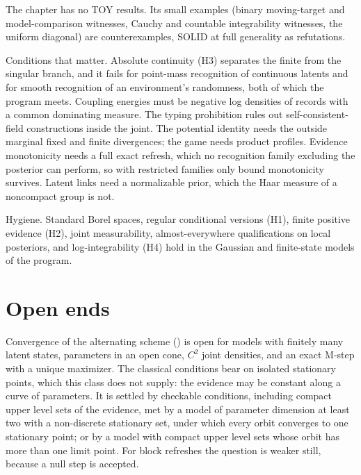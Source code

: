 The chapter has no TOY results. Its small examples (binary moving-target and model-comparison witnesses,
Cauchy and countable integrability witnesses, the uniform diagonal) are counterexamples, SOLID at full
generality as refutations.

\begin{hygiene}
Conditions that matter. Absolute continuity (H3) separates the finite from the singular branch, and it fails
for point-mass recognition of continuous latents and for smooth recognition of an environment's randomness,
both of which the program meets. Coupling energies must be negative log densities of records with a common
dominating measure. The typing prohibition rules out self-consistent-field constructions inside the joint. The
potential identity needs the outside marginal fixed and finite divergences; the game needs product profiles.
Evidence monotonicity needs a full exact refresh, which no recognition family excluding the posterior can
perform, so with restricted families only bound monotonicity survives. Latent links need a normalizable prior,
which the Haar measure of a noncompact group is not.

Hygiene. Standard Borel spaces, regular conditional versions (H1), finite positive evidence (H2), joint
measurability, almost-everywhere qualifications on local posteriors, and log-integrability (H4) hold in the
Gaussian and finite-state models of the program.
\end{hygiene}

\section{Open ends}
\label{comp:ch05-open}

Convergence of the alternating scheme () is open for models with finitely
many latent states, parameters in an open cone, $C^2$ joint densities, and an exact M-step with a unique
maximizer. The classical conditions \citep{Wu1983} bear on isolated stationary points, which this class does not
supply: the evidence may be constant along a curve of parameters. It is settled by checkable conditions,
including compact upper level sets of the evidence, met by a model of parameter dimension at least two with a
non-discrete stationary set, under which every orbit converges to one stationary point; or by a model with compact
upper level sets whose orbit has more than one limit point. For block refreshes the question is weaker still,
because a null step is accepted.

